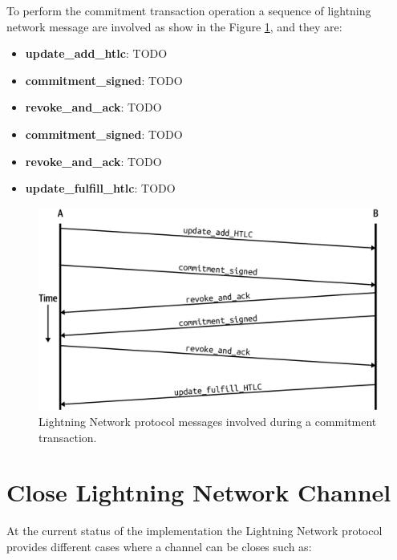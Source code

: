 To perform the commitment transaction operation a sequence of lightning network message are involved as show in the Figure \ref{fig:commitment_transaction_ln_messages}, and they are:

\begin{itemize}
  \item {\bf update\_add\_htlc}: TODO
  \item {\bf commitment\_signed}: TODO
  \item {\bf revoke\_and\_ack}: TODO
  \item {\bf commitment\_signed}: TODO
  \item {\bf revoke\_and\_ack}: TODO
  \item {\bf update\_fulfill\_htlc}: TODO
\end{itemize}


\begin{figure}[h]
  \begin{center}
  \includegraphics[width=0.6\columnwidth]{imgs/mtln_0903.png}
  \end{center}
  \caption{Lightning Network protocol messages involved during a commitment transaction.}
  \label{fig:commitment_transaction_ln_messages}
\end{figure}


\section{Close Lightning Network Channel}
\label{sec:close_operation}

At the current status of the implementation the Lightning Network protocol provides different cases where a channel can be closes such as:

